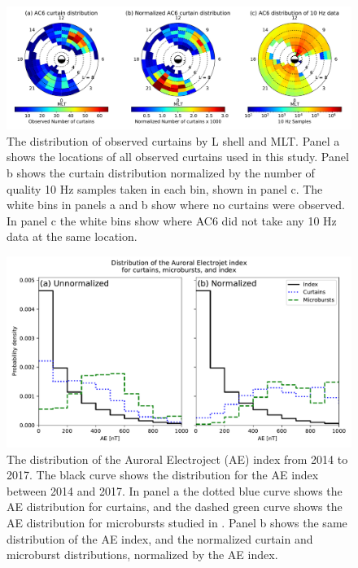 \documentclass[draft]{agujournal2019}
\begin{document}
\begin{figure}
\includegraphics[width=\textwidth]{fig2_3.pdf}
\caption{The distribution of observed curtains by L shell and MLT. Panel a shows the locations of all observed curtains used in this study. Panel b shows the curtain distribution normalized by the number of quality 10 Hz samples taken in each bin, shown in panel c. The white bins in panels a and b show where no curtains were observed. In panel c the white bins show where AC6 did not take any 10 Hz data at the same location.}
\label{l_mlt_dist}
\end{figure}

\begin{figure}
\includegraphics[width=\textwidth]{ac6_curtain_microburst_AE_dist.pdf}
\caption{The distribution of the Auroral Electroject (AE) index from 2014 to 2017. The black curve shows the distribution for the AE index between 2014 and 2017. In panel a the dotted blue curve shows the AE distribution for curtains, and the dashed green curve shows the AE distribution for microbursts studied in . Panel b shows the same distribution of the AE index, and the normalized curtain and microburst distributions, normalized by the AE index.}
\label{ae_dist}
\end{figure}
\end{document}
